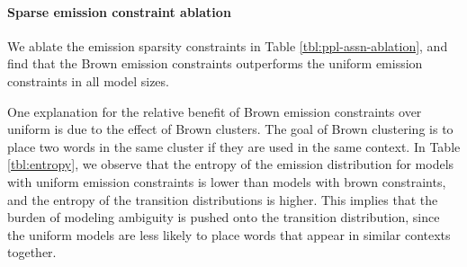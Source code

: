 \documentclass[11pt,a4paper]{article}
\begin{document}
\paragraph{Sparse emission constraint ablation}
We ablate the emission sparsity constraints in Table \ref{tbl:ppl-assn-ablation},
and find that the Brown emission constraints outperforms the uniform emission constraints
in all model sizes.

One explanation for the relative benefit of Brown emission constraints over uniform
is due to the effect of Brown clusters.
The goal of Brown clustering is to place two words in the same cluster
if they are used in the same context.
In Table \ref{tbl:entropy}, we observe that the entropy of the emission distribution
for models with uniform emission
constraints is lower than models with brown constraints,
and the entropy of the transition distributions is higher.
This implies that the burden of modeling ambiguity is pushed onto
the transition distribution,
since the uniform models are less likely to place words that appear in
similar contexts together.



\end{document}
